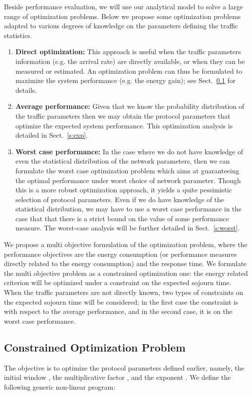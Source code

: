 \documentclass[journal]{IEEEtran}
\begin{document}
Beside performance evaluation, we will use our analytical model to solve a large range of optimization problems. Below we propose some optimization problems adapted to various degrees of knowledge on the parameters defining the traffic statistics. 
\begin{enumerate}
\item {\bf Direct optimization:}
This approach is useful when the traffic parameters information (e.g. the arrival rate) are directly available, or when they can be measured or estimated. An optimization problem can thus be formulated to maximize the system performance (e.g. the energy gain); see Sect.~\ref{s:optim} for details.
\item
{\bf Average performance:} Given that we know the probability distribution of the traffic parameters then we may obtain the protocol parameters that optimize the expected system performance. This optimization analysis is detailed in Sect.~\ref{s:exp}.
\item
{\bf Worst case performance:} In the case where we do not have knowledge of even the statistical distribution of the network parameters, then we can formulate the worst case optimization problem which aims at guaranteeing the optimal performance under worst choice of network parameter. Though this is a more robust optimization approach, it yields a quite pessimistic selection of protocol parameters. Even if we do have knowledge of the statistical distribution, we may have to use a worst case performance in the case that that there is a strict bound on the value of some performance measure. The worst-case analysis will be further detailed in Sect.~\ref{s:worst}.
\end{enumerate}
We propose a multi objective formulation of the optimization problem, where the performance objectives are the energy consumption (or performance measures directly related to the energy consumption) and the response time. We formulate the multi objective problem as a constrained optimization one: the energy related criterion will be optimized under a constraint on the expected sojourn time. When the traffic parameters are not directly known, two types of constraints on the expected sojourn time will be considered; in the first case the constraint is with respect to the average performance, and in the second case, it is on the worst case performance.
\subsection{Constrained Optimization Problem}
\label{s:optim}
The objective is to optimize the protocol parameters defined earlier, namely, the initial window , the multiplicative factor , and the exponent . We define the following generic non-linear program:
\end{document}
